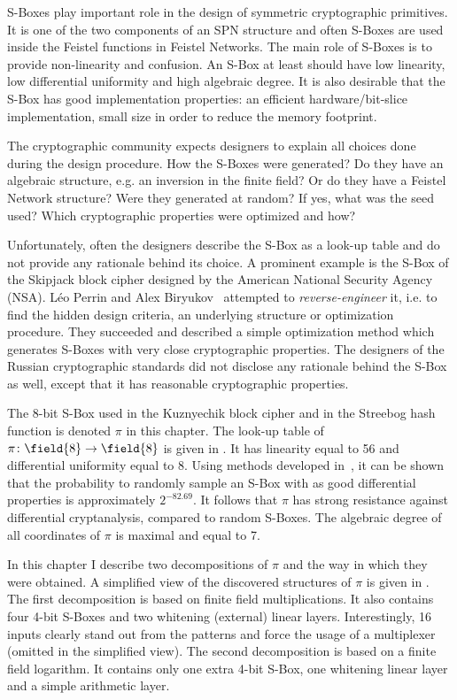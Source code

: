 
S-Boxes play important role in the design of symmetric cryptographic primitives. It is one of the two components of an SPN structure and often S-Boxes are used inside the Feistel functions in Feistel Networks. The main role of S-Boxes is to provide non-linearity and confusion. An S-Box at least should have low linearity, low differential uniformity and high algebraic degree. It is also desirable that the S-Box has good implementation properties: an efficient hardware/bit-slice implementation, small size in order to reduce the memory footprint. 

The cryptographic community expects designers to explain all choices done during the design procedure. How the S-Boxes were generated? Do they have an algebraic structure, e.g. an inversion in the finite field? Or do they have a Feistel Network structure? Were they generated at random? If yes, what was the seed used? Which cryptographic properties were optimized and how?

Unfortunately, often the designers describe the S-Box as a look-up table and do not provide any rationale behind its choice. A prominent example is the S-Box of the Skipjack block cipher designed by the American National Security Agency (NSA). Léo Perrin and Alex Biryukov~\cite{LeoRE} attempted to \emph{reverse-engineer} it, i.e. to find the hidden design criteria, an underlying structure or optimization procedure. They succeeded and described a simple optimization method which generates S-Boxes with very close cryptographic properties. The designers of the Russian cryptographic standards did not disclose any rationale behind the S-Box as well, except that it has reasonable cryptographic properties.

The 8-bit S-Box used in the Kuznyechik block cipher and in the Streebog hash function is denoted $\pi$ in this chapter. The look-up table of $\pi\colon \field{8} \to \field{8}$ is given in . It has linearity equal to 56 and differential uniformity equal to 8. Using methods developed in~\cite{LeoRE}, it can be shown that the probability to randomly sample an S-Box with as good differential properties is approximately $2^{-82.69}$. It follows that $\pi$ has strong resistance against differential cryptanalysis, compared to random S-Boxes. The algebraic degree of all coordinates of $\pi$ is maximal and equal to 7.


In this chapter I describe two decompositions of $\pi$ and the way in which they were obtained. A simplified view of the discovered structures of $\pi$ is given in  . The first decomposition is based on finite field multiplications. It also contains four 4-bit S-Boxes and two whitening (external) linear layers. Interestingly, 16 inputs clearly stand out from the patterns and force the usage of a multiplexer (omitted in the simplified view). The second decomposition is based on a finite field logarithm. It contains only one extra 4-bit S-Box, one whitening linear layer and a simple arithmetic layer.

